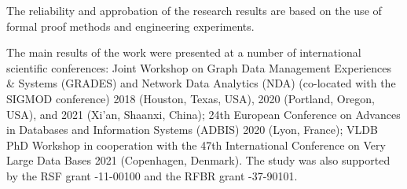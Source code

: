{\reliability} 
The reliability and approbation of the research results are based on the use of formal proof methods and engineering experiments.

The main results of the work were presented at a number of international scientific conferences: Joint Workshop on Graph Data Management Experiences \& Systems (GRADES) and Network Data Analytics (NDA) (co-located with the SIGMOD conference) 2018 (Houston, Texas, USA), 2020 (Portland, Oregon, USA), and 2021 (Xi'an, Shaanxi, China); 24th European Conference on Advances in Databases and Information Systems (ADBIS) 2020 (Lyon, France); VLDB PhD Workshop in cooperation with the 47th International Conference on Very Large Data Bases 2021 (Copenhagen, Denmark). The study was also supported by the RSF grant -11-00100 and the RFBR grant -37-90101.


